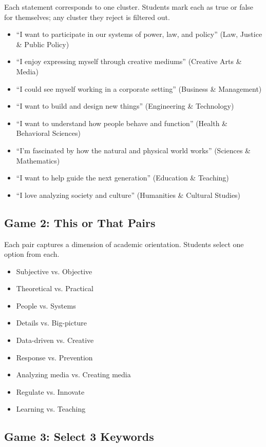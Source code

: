 Each statement corresponds to one cluster. Students mark each as true or false for themselves; any cluster they reject is filtered out.

\begin{itemize}
    \item ``I want to participate in our systems of power, law, and policy'' (Law, Justice \& Public Policy)
    \item ``I enjoy expressing myself through creative mediums'' (Creative Arts \& Media)
    \item ``I could see myself working in a corporate setting'' (Business \& Management)
    \item ``I want to build and design new things'' (Engineering \& Technology)
    \item ``I want to understand how people behave and function'' (Health \& Behavioral Sciences)
    \item ``I'm fascinated by how the natural and physical world works'' (Sciences \& Mathematics)
    \item ``I want to help guide the next generation'' (Education \& Teaching)
    \item ``I love analyzing society and culture'' (Humanities \& Cultural Studies)
\end{itemize}

\subsection{Game 2: This or That Pairs}

Each pair captures a dimension of academic orientation. Students select one option from each.

\begin{itemize}
    \item Subjective vs. Objective
    \item Theoretical vs. Practical
    \item People vs. Systems
    \item Details vs. Big-picture
    \item Data-driven vs. Creative
    \item Response vs. Prevention
    \item Analyzing media vs. Creating media
    \item Regulate vs. Innovate
    \item Learning vs. Teaching
\end{itemize}

\subsection{Game 3: Select 3 Keywords}

